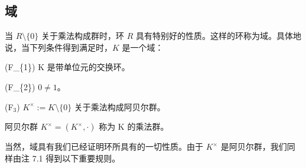 \subsection*{域}

当 $R \setminus \{0\}$ 关于乘法构成群时，环 $R$ 具有特别好的性质。这样的环称为域。具体地说，当下列条件得到满足时，$K$ 是一个域：

(F\_\{1\}) K 是带单位元的交换环。

(F\_\{2\})  $ 0 \neq 1 $。

(F$_3$)  $ K^\times := K \setminus \{0\} $ 关于乘法构成阿贝尔群。

阿贝尔群  $ K^{\times} = (K^{\times}, \cdot) $ 称为 K 的乘法群。

当然，域具有我们已经证明环所具有的一切性质。由于  $ K^{\times} $ 是阿贝尔群，我们同样由注 7.1 得到以下重要规则。

